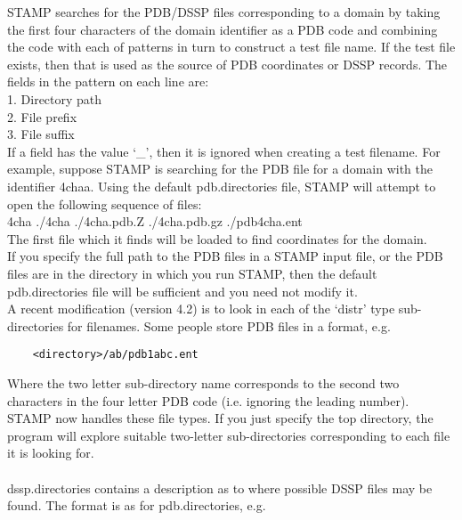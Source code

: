     STAMP searches for the PDB/DSSP files corresponding to a domain
    by taking the first four characters of the domain identifier
    as a PDB code and combining the code with each of patterns in turn
    to construct a test file name. If the test file exists, then that
    is used as the source of PDB coordinates or DSSP records. The fields in the pattern on
    each line are:
    \\
    1. Directory path
    \\
    2. File prefix
    \\
    3. File suffix
    \\
    If a field has the value `\_',  then it is ignored when creating a test filename. 
    For example, suppose STAMP is searching for the PDB file for 
    a domain with the identifier 4chaa. Using the default pdb.directories file,
    STAMP will attempt to open the following sequence of files:
    \\
    4cha
    ./4cha
    ./4cha.pdb.Z
    ./4cha.pdb.gz
    ./pdb4cha.ent
    \\
    The first file which it finds will be loaded to find coordinates for the
    domain.
    \\
    If you specify the full path to the PDB files in a STAMP input file, or the PDB  
    files are in the directory in which you run STAMP, then the default pdb.directories
    file will be sufficient and you need not modify it.
    \\
    A recent modification (version 4.2) is to look
    in each of the `distr' type sub-directories for filenames.  Some people
    store PDB files in a format, e.g.\\

    \begin{scriptsize}\begin{verbatim}
    <directory>/ab/pdb1abc.ent
    \end{verbatim} \end{scriptsize}

    Where the two letter sub-directory name corresponds to the second two characters
    in the four letter PDB code (i.e. ignoring the leading number).  STAMP now
    handles these file types.  If you just specify the top directory, the program
    will explore suitable two-letter sub-directories corresponding to each file it
    is looking for.\\
    \\
    dssp.directories contains a description as to where possible DSSP files
    may be found.  The format is as for pdb.directories, e.g.\\

